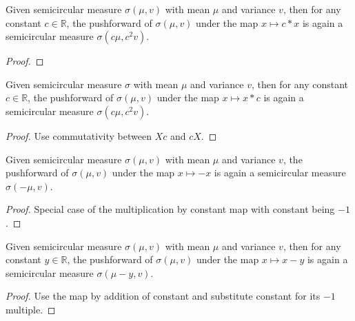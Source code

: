 \begin{lemma}
  \label{lem:semicircleReal_map_const_mul}
  \notready
    Given semicircular measure $\sigma(\mu, v)$ with mean $\mu$ and variance $v$, then for any constant $c \in \mathbb{R}$, the pushforward
  of $\sigma(\mu, v)$ under the map $x \mapsto c * x$ is again a semicircular measure $\sigma(c\mu, c^2v)$. 
  \begin{proof}
  \end{proof}
\end{lemma}



\begin{lemma}
  \label{lem:semicircleReal_map_mul_const}
  \leanok
   Given semicircular measure $\sigma$ with mean $\mu$ and variance $v$, then for any constant $c \in \mathbb{R}$, the pushforward
  of $\sigma(\mu, v)$ under the map $x \mapsto x * c$ is again a semicircular measure $\sigma(c\mu, c^2v)$. 
  \begin{proof}
    Use commutativity between $Xc$ and $cX$.
  \end{proof}
\end{lemma}



\begin{lemma}
  \label{lem:semicircleReal_map_neg}
  \leanok
  Given semicircular measure $\sigma(\mu, v)$ with mean $\mu$ and variance $v$, the pushforward
  of $\sigma(\mu, v)$ under the map $x \mapsto -x$ is again a semicircular measure $\sigma(- \mu, v)$. 
  \begin{proof}
     Special case of the multiplication by constant map with constant being $-1$.
  \end{proof}
\end{lemma}



\begin{lemma}
  \label{lem:semicircleReal_map_sub_const}
  \leanok
  Given semicircular measure $\sigma(\mu, v)$ with mean $\mu$ and variance $v$, then for any constant $y \in \mathbb{R}$, the pushforward
  of $\sigma(\mu, v)$ under the map $x \mapsto x - y$ is again a semicircular measure $\sigma( \mu - y, v)$. 
  \begin{proof}
   Use the map by addition of constant and substitute constant for its $-1$ multiple.
  \end{proof}
\end{lemma}


